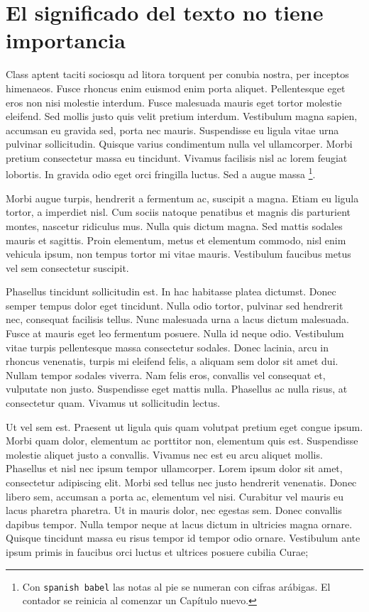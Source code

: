 \documentclass[11pt, a4paper]{report}
\begin{document}
\section{El significado del texto no tiene importancia}

Class aptent taciti sociosqu ad litora torquent per conubia nostra, per inceptos himenaeos. Fusce rhoncus enim euismod enim porta aliquet. Pellentesque eget eros non nisi molestie interdum. Fusce malesuada mauris eget tortor molestie eleifend. Sed mollis justo quis velit pretium interdum. Vestibulum magna sapien, accumsan eu gravida sed, porta nec mauris. Suspendisse eu ligula vitae urna pulvinar sollicitudin. Quisque varius condimentum nulla vel ullamcorper. Morbi pretium consectetur massa eu tincidunt. Vivamus facilisis nisl ac lorem feugiat lobortis. In gravida odio eget orci fringilla luctus. Sed a augue massa%
\footnote{Con \texttt{spanish babel} las notas al pie se numeran con cifras arábigas. El contador se reinicia al comenzar un Capítulo nuevo.}.

Morbi augue turpis, hendrerit a fermentum ac, suscipit a magna. Etiam eu ligula tortor, a imperdiet nisl. Cum sociis natoque penatibus et magnis dis parturient montes, nascetur ridiculus mus. Nulla quis dictum magna. Sed mattis sodales mauris et sagittis. Proin elementum, metus et elementum commodo, nisl enim vehicula ipsum, non tempus tortor mi vitae mauris. Vestibulum faucibus metus vel sem consectetur suscipit.  

Phasellus tincidunt sollicitudin est. In hac habitasse platea dictumst. Donec semper tempus dolor eget tincidunt. Nulla odio tortor, pulvinar sed hendrerit nec, consequat facilisis tellus. Nunc malesuada urna a lacus dictum malesuada. Fusce at mauris eget leo fermentum posuere. Nulla id neque odio. Vestibulum vitae turpis pellentesque massa consectetur sodales. Donec lacinia, arcu in rhoncus venenatis, turpis mi eleifend felis, a aliquam sem dolor sit amet dui. Nullam tempor sodales viverra. Nam felis eros, convallis vel consequat et, vulputate non justo. Suspendisse eget mattis nulla. Phasellus ac nulla risus, at consectetur quam. Vivamus ut sollicitudin lectus.

Ut vel sem est. Praesent ut ligula quis quam volutpat pretium eget congue ipsum. Morbi quam dolor, elementum ac porttitor non, elementum quis est. Suspendisse molestie aliquet justo a convallis. Vivamus nec est eu arcu aliquet mollis. Phasellus et nisl nec ipsum tempor ullamcorper. Lorem ipsum dolor sit amet, consectetur adipiscing elit. Morbi sed tellus nec justo hendrerit venenatis. Donec libero sem, accumsan a porta ac, elementum vel nisi. Curabitur vel mauris eu lacus pharetra pharetra. Ut in mauris dolor, nec egestas sem. Donec convallis dapibus tempor. Nulla tempor neque at lacus dictum in ultricies magna ornare. Quisque tincidunt massa eu risus tempor id tempor odio ornare. Vestibulum ante ipsum primis in faucibus orci luctus et ultrices posuere cubilia Curae;
\end{document}

